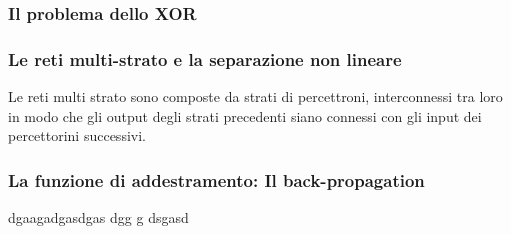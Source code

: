 \documentclass[10pt,a4paper]{article}
\begin{document}
\subsubsection*{Il problema dello XOR}
 
\subsubsection*{Le reti multi-strato e la separazione non lineare} 
Le reti multi strato sono composte da strati di percettroni, interconnessi tra loro in modo che gli output degli strati precedenti siano connessi con gli input dei percettorini successivi.
 
\subsubsection{La funzione di addestramento: Il back-propagation} 



dgaagadgasdgas
dgg
g
dsgasd
\end{document}
